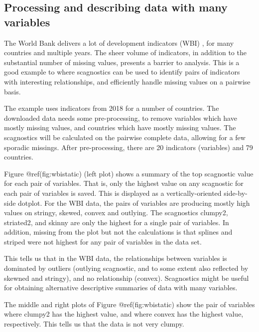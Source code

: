 \hypertarget{processing-and-describing-data-with-many-variables}{%
\subsection{Processing and describing data with many
variables}\label{processing-and-describing-data-with-many-variables}}

The World Bank delivers a lot of development indicators (WBI)
\citep{WBI}, for many countries and multiple years. The sheer volume of
indicators, in addition to the substantial number of missing values,
presents a barrier to analysis. This is a good example to where
scagnostics can be used to identify pairs of indicators with interesting
relationships, and efficiently handle missing values on a pairwise
basis.

The example uses indicators from 2018 for a number of countries. The
downloaded data needs some pre-processing, to remove variables which
have mostly missing values, and countries which have mostly missing
values. The scagnostics will be calculated on the pairwise complete
data, allowing for a few sporadic missings. After pre-processing, there
are 20 indicators (variables) and 79 countries.

Figure @ref(fig:wbistatic) (left plot) shows a summary of the top
scagnostic value for each pair of variables. That is, only the highest
value on any scagnostic for each pair of variables is saved. This is
displayed as a vertically-oriented side-by-side dotplot. For the WBI
data, the pairs of variables are producing mostly high values on
stringy, skewed, convex and outlying. The scagnostics clumpy2,
striated2, and skinny are only the highest for a single pair of
variables. In addition, missing from the plot but not the calculations
is that splines and striped were not highest for any pair of variables
in the data set.

This tells us that in the WBI data, the relationships between variables
is dominated by outliers (outlying scagnostic, and to some extent also
reflected by skewned and stringy), and no relationship (convex).
Scagnostics might be useful for obtaining alternative descriptive
summaries of data with many variables.

The middle and right plots of Figure @ref(fig:wbistatic) show the pair
of variables where clumpy2 has the highest value, and where convex has
the highest value, respectively. This tells us that the data is not very
clumpy.

